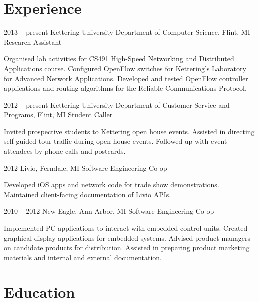 \documentclass[12pt]{tccv/actccv}
\begin{document}
\maketitle

\section{Experience}

\begin{eventlist}

\item{2013 -- present}
     {Kettering University Department of Computer Science, Flint, MI}
     {Research Assistant}
     
     Organised lab activities for CS491 High-Speed Networking and 
     Distributed Applications course. 
     Configured OpenFlow switches for Kettering's Laboratory for Advanced 
     Network Applications.
     Developed and tested OpenFlow controller applications and routing algorithms 
     for the Reliable Communications Protocol.
     
\item{2012 -- present}
     {Kettering University Department of Customer Service and Programs, Flint, MI}
     {Student Caller}
     
     Invited prospective students to Kettering open house events.
     Assisted in directing self-guided tour traffic during open house events.
     Followed up with event attendees by phone calls and postcards.
     
\item{2012}
     {Livio, Ferndale, MI}
     {Software Engineering Co-op}
     
     Developed iOS apps and network code for trade show demonstrations.
     Maintained client-facing documentation of Livio APIs.
     
\item{2010 -- 2012}
     {New Eagle, Ann Arbor, MI}
     {Software Engineering Co-op}
     
     Implemented PC applications to interact with embedded control units.
     Created graphical display applications for embedded systems.
     Advised product managers on candidate products for distribution.
     Assisted in preparing product marketing materials and internal and 
     external documentation.

\end{eventlist}

\eject
\section{Education}
\end{document}
